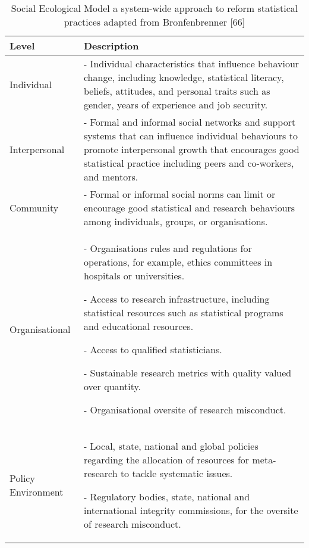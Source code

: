 \begin{table}[ht]
\begin{widestuff}
\caption{Social Ecological Model a system-wide approach to reform statistical practices adapted from Bronfenbrenner [66]} 
\begin{tabular}{p{5cm}p{13cm}}
  \toprule
{\bf Level} & {\bf Description} \\ 
  \midrule
Individual & - Individual characteristics that influence behaviour change, including knowledge, statistical literacy, beliefs, attitudes, and personal traits such as gender, years of experience and job security. \\ 
  Interpersonal & - Formal and informal social networks and support systems that can influence individual behaviours to promote interpersonal growth that encourages good statistical practice including peers and co-workers, and mentors. \\ 
  Community & - Formal or informal social norms can limit or encourage good statistical and research behaviours among individuals, groups, or organisations. 
 \\ 
  Organisational & - Organisations rules and regulations for operations, for example, ethics committees in hospitals or universities.
 
	- Access to research infrastructure, including statistical resources such as statistical programs and educational resources. 

	- Access to qualified statisticians. 

	- Sustainable research metrics with quality valued over quantity. 

 -	Organisational oversite of research misconduct. \\ 
  Policy Environment & - Local, state, national and global policies regarding the allocation of resources for meta-research to tackle systematic issues. 

 - Regulatory bodies, state, national and international integrity commissions, for the oversite of research misconduct. \\ 
   \bottomrule
\end{tabular}
\end{widestuff}
\end{table}

